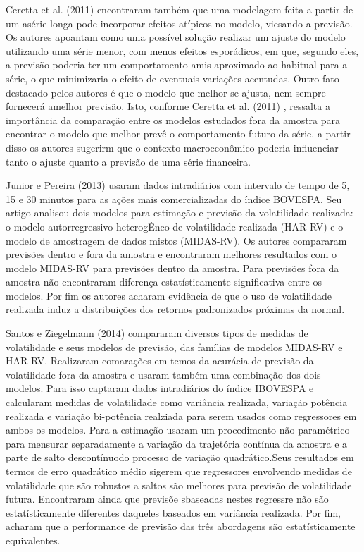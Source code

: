 \documentclass[]{article}
\begin{document}
Ceretta et al. (2011) encontraram também que uma modelagem feita a
partir de um asérie longa pode incorporar efeitos atípicos no modelo,
viesando a previsão. Os autores apoantam como uma possível solução
realizar um ajuste do modelo utilizando uma série menor, com menos
efeitos esporádicos, em que, segundo eles, a previsão poderia ter um
comportamento amis aproximado ao habitual para a série, o que
minimizaria o efeito de eventuais variações acentudas. Outro fato
destacado pelos autores é que o modelo que melhor se ajusta, nem sempre
fornecerá amelhor previsão. Isto, conforme Ceretta et al. (2011) ,
ressalta a importância da comparação entre os modelos estudados fora da
amostra para encontrar o modelo que melhor prevê o comportamento futuro
da série. a partir disso os autores sugerirm que o contexto
macroeconômico poderia influenciar tanto o ajuste quanto a previsão de
uma série financeira.

Junior e Pereira (2013) usaram dados intradiários com intervalo de tempo
de 5, 15 e 30 minutos para as ações mais comercializadas do índice
BOVESPA. Seu artigo analisou dois modelos para estimação e previsão da
volatilidade realizada: o modelo autorregressivo heterogÊneo de
volatilidade realizada (HAR-RV) e o modelo de amostragem de dados mistos
(MIDAS-RV). Os autores compararam previsões dentro e fora da amostra e
encontraram melhores resultados com o modelo MIDAS-RV para previsões
dentro da amostra. Para previsões fora da amostra não encontraram
diferença estatísticamente significativa entre os modelos. Por fim os
autores acharam evidência de que o uso de volatilidade realizada induz a
distribuições dos retornos padronizados próximas da normal.

Santos e Ziegelmann (2014) compararam diversos tipos de medidas de
volatilidade e seus modelos de previsão, das famílias de modelos
MIDAS-RV e HAR-RV. Realizaram comarações em temos da acurácia de
previsão da volatilidade fora da amostra e usaram também uma combinação
dos dois modelos. Para isso captaram dados intradiários do índice
IBOVESPA e calcularam medidas de volatilidade como variância realizada,
variação potência realizada e variação bi-potência realziada para serem
usados como regressores em ambos os modelos. Para a estimação usaram um
procedimento não paramétrico para mensurar separadamente a variação da
trajetória contínua da amostra e a parte de salto descontínuodo processo
de variação quadrático.Seus resultados em termos de erro quadrático
médio sigerem que regressores envolvendo medidas de volatilidade que são
robustos a saltos são melhores para previsão de volatilidade futura.
Encontraram ainda que previsõe sbaseadas nestes regressre não são
estatísticamente diferentes daqueles baseados em variância realizada.
Por fim, acharam que a performance de previsão das três abordagens são
estatísticamente equivalentes.
\end{document}
